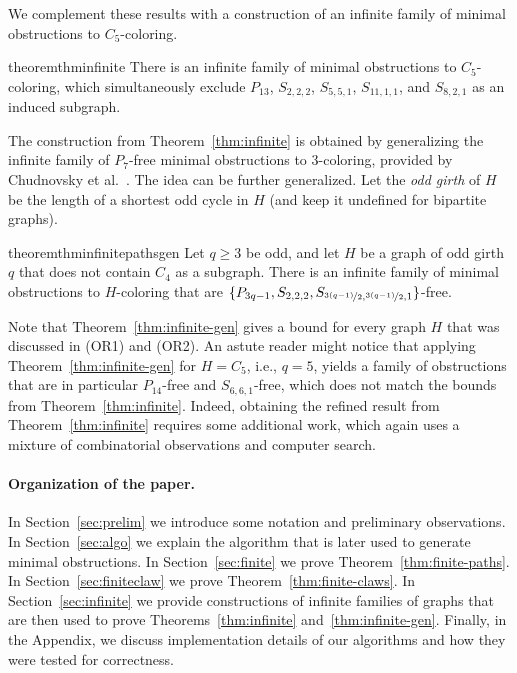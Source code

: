 \documentclass[11pt,a4paper]{article}
\theoremstyle{mystyle}
\newtheorem{theorem}{Theorem}[section]
\begin{document}
\medskip

We complement these results with a construction of an infinite family of minimal obstructions to $C_5$-coloring.
\begin{restatable}{theorem}{thminfinite}
 \label{thm:infinite}
  There is an infinite family of minimal obstructions to $C_5$-coloring, which simultaneously exclude $P_{13}$, $S_{2,2,2}$,
$S_{5,5,1}$, $S_{11,1,1}$, and $S_{8,2,1}$ as an induced subgraph.
  \end{restatable}
  

The construction from Theorem~\ref{thm:infinite} is obtained by generalizing the infinite family of $P_7$-free minimal obstructions to 3-coloring, provided by Chudnovsky et al.~\cite{DBLP:journals/jct/ChudnovskyGSZ20}.
The idea can be further generalized. Let the \textit{odd girth} of $H$ be the length of a shortest odd cycle in $H$ (and keep it undefined for bipartite graphs).

\begin{restatable}{theorem}{thminfinitepathsgen}
 \label{thm:infinite-gen}
  Let $q \geq 3$ be odd, and let $H$ be a graph of odd girth $q$ that does not contain $C_4$ as a subgraph.
     There is an infinite family of minimal obstructions to $H$-coloring that are $\{P_{3q-1}, S_{2,2,2}, S_{\nicefrac{3(q-1)}{2}, \nicefrac{3(q-1)}{2}, 1}\}$-free.
  \end{restatable}

Note that Theorem~\ref{thm:infinite-gen} gives a bound for every graph $H$ that was discussed in (OR1) and (OR2).
An astute reader might notice that applying Theorem~\ref{thm:infinite-gen} for $H=C_5$, i.e., $q=5$,
yields a family of obstructions that are in particular  $P_{14}$-free and $S_{6,6,1}$-free, which does not match the bounds 
from Theorem~\ref{thm:infinite}.
Indeed, obtaining the refined result from Theorem~\ref{thm:infinite} requires some additional work, which again uses a mixture of combinatorial observations and computer search.


\paragraph{Organization of the paper.}
In Section~\ref{sec:prelim} we introduce some notation and preliminary observations.
In Section~\ref{sec:algo} we explain the algorithm that is later used to generate minimal obstructions.
In Section~\ref{sec:finite} we prove Theorem~\ref{thm:finite-paths}.
In Section~\ref{sec:finiteclaw} we prove Theorem~\ref{thm:finite-claws}.
In Section~\ref{sec:infinite} we provide constructions of infinite families of graphs that are then used to prove Theorems~\ref{thm:infinite} and~\ref{thm:infinite-gen}.
Finally, in the Appendix, we discuss implementation details of our algorithms and how they were tested for correctness.
 
\end{document}
